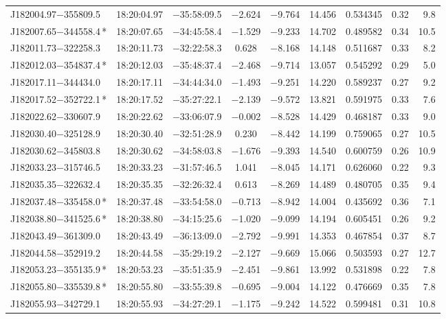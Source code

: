 \begin{table*}
\begin{tabular}{lcccccccr}
J182004.97$-$355809.5 & 18:20:04.97 & $-$35:58:09.5 & $-$2.624 & $-$9.764 & 14.456 & 0.534345 & 0.32 & 9.8 \\
J182007.65$-$344558.4\,* & 18:20:07.65 & $-$34:45:58.4 & $-$1.529 & $-$9.233 & 14.702 & 0.489582 & 0.34 & 10.5 \\
J182011.73$-$322258.3 & 18:20:11.73 & $-$32:22:58.3 &  0.628 & $-$8.168 & 14.148 & 0.511687 & 0.33 & 8.2 \\
J182012.03$-$354837.4\,* & 18:20:12.03 & $-$35:48:37.4 & $-$2.468 & $-$9.714 & 13.057 & 0.545292 & 0.29 & 5.0 \\
J182017.11$-$344434.0 & 18:20:17.11 & $-$34:44:34.0 & $-$1.493 & $-$9.251 & 14.220 & 0.589237 & 0.27 & 9.2 \\
J182017.52$-$352722.1\,* & 18:20:17.52 & $-$35:27:22.1 & $-$2.139 & $-$9.572 & 13.821 & 0.591975 & 0.33 & 7.6 \\
J182022.62$-$330607.9 & 18:20:22.62 & $-$33:06:07.9 & $-$0.002 & $-$8.528 & 14.429 & 0.468187 & 0.33 & 9.0 \\
J182030.40$-$325128.9 & 18:20:30.40 & $-$32:51:28.9 &  0.230 & $-$8.442 & 14.199 & 0.759065 & 0.27 & 10.5 \\
J182030.62$-$345803.8 & 18:20:30.62 & $-$34:58:03.8 & $-$1.676 & $-$9.393 & 14.540 & 0.600759 & 0.26 & 10.9 \\
J182033.23$-$315746.5 & 18:20:33.23 & $-$31:57:46.5 &  1.041 & $-$8.045 & 14.171 & 0.626060 & 0.22 & 9.3 \\
J182035.35$-$322632.4 & 18:20:35.35 & $-$32:26:32.4 &  0.613 & $-$8.269 & 14.489 & 0.480705 & 0.35 & 9.4 \\
J182037.48$-$335458.0\,* & 18:20:37.48 & $-$33:54:58.0 & $-$0.713 & $-$8.942 & 14.004 & 0.435692 & 0.36 & 7.1 \\
J182038.80$-$341525.6\,* & 18:20:38.80 & $-$34:15:25.6 & $-$1.020 & $-$9.099 & 14.194 & 0.605451 & 0.26 & 9.2 \\
J182043.49$-$361309.0 & 18:20:43.49 & $-$36:13:09.0 & $-$2.792 & $-$9.991 & 14.353 & 0.467854 & 0.37 & 8.7 \\
J182044.58$-$352919.2 & 18:20:44.58 & $-$35:29:19.2 & $-$2.127 & $-$9.669 & 15.066 & 0.503593 & 0.27 & 12.7 \\
J182053.23$-$355135.9\,* & 18:20:53.23 & $-$35:51:35.9 & $-$2.451 & $-$9.861 & 13.992 & 0.531898 & 0.22 & 7.8 \\
J182055.80$-$335539.8\,* & 18:20:55.80 & $-$33:55:39.8 & $-$0.695 & $-$9.004 & 14.122 & 0.476669 & 0.35 & 7.8 \\
J182055.93$-$342729.1 & 18:20:55.93 & $-$34:27:29.1 & $-$1.175 & $-$9.242 & 14.522 & 0.599481 & 0.31 & 10.8 \\

\end{tabular}
\end{table*}
